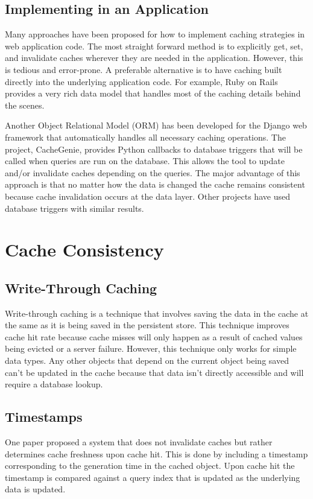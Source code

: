 \documentclass[12pt]{article}
\begin{document}
\subsection{Implementing in an Application}
Many approaches have been proposed for how to implement caching strategies in web application code.
The most straight forward method is to explicitly get, set, and invalidate caches wherever they are needed in the application.
However, this is tedious and error-prone.\cite{keyBasedCacheExpiration}\cite{triggerBasedORM}
A preferable alternative is to have caching built directly into the underlying application code.
For example, Ruby on Rails provides a very rich data model that handles most of the caching details behind the scenes.\cite{keyBasedCacheExpiration}

Another Object Relational Model (ORM) has been developed for the Django web framework that automatically handles all necessary caching operations.\cite{triggerBasedORM}
The project, CacheGenie, provides Python callbacks to database triggers that will be called when queries are run on the database. This allows the tool to update and/or invalidate caches depending on the queries.
The major advantage of this approach is that no matter how the data is changed the cache remains consistent because cache invalidation occurs at the data layer.
Other projects have used database triggers with similar results.\cite{scalableConsistentCaching}

\section{Cache Consistency}
\subsection{Write-Through Caching}
Write-through caching is a technique that involves saving the data in the cache at the same as it is being saved in the persistent store.\cite{writeThroughCaching}
This technique improves cache hit rate because cache misses will only happen as a result of cached values being evicted or a server failure.
However, this technique only works for simple data types.
Any other objects that depend on the current object being saved can't be updated in the cache because that data isn't directly accessible and will require a database lookup.

\subsection{Timestamps}
One paper proposed a system that does not invalidate caches but rather determines cache freshness upon cache hit.\cite{cacheInvalidationWebSearch}
This is done by including a timestamp corresponding to the generation time in the cached object.
Upon cache hit the timestamp is compared against a query index that is updated as the underlying data is updated.
\end{document}
